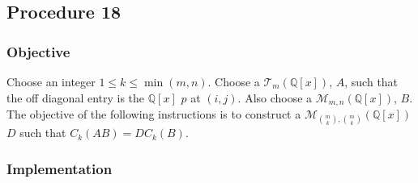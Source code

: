 \documentclass[twocolumn]{article}
\begin{document}
		\subsection{Procedure 18}\label{sec:procedure 18}
			\subsubsection{Objective}
				Choose an integer $1\le k\le\min(m,n)$. Choose a $\mathcal{T}_{m}(\mathbb{Q}[x])$, $A$, such that the off diagonal entry is the $\mathbb{Q}[x]$ $p$ at $(i,j)$. Also choose a $\mathcal{M}_{m,n}(\mathbb{Q}[x])$, $B$. The objective of the following instructions is to construct a $\mathcal{M}_{\binom{m}{k},\binom{m}{k}}(\mathbb{Q}[x])$ $D$ such that $C_k(AB)=DC_k(B)$.
			\subsubsection{Implementation}
\end{document}
